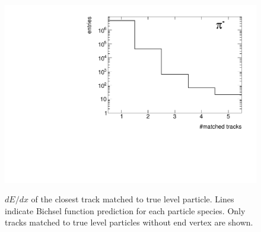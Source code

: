 \begin{figure}[ht]
{		\includegraphics[width=\linewidth,page=36]{graphics/eff/trackSplitting_CD.pdf}\\
	}%
	\caption[$dE/dx$ of the closest track matched to true level particle.]{$dE/dx$ of the closest track matched to true level particle. Lines indicate Bichsel function prediction for each particle species. Only tracks matched to true level particles without end vertex  are shown.}\label{fig:trackSplittingNominaldEdx}
\end{figure}
